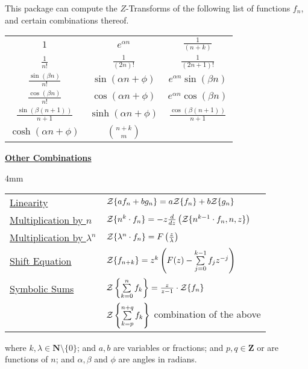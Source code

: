 This package can compute the $Z$-Transforms of the following
list of functions $f_n$, and certain combinations thereof.
\begin{center}
  \renewcommand{\arraystretch}{2}
  \setlength{\tabcolsep}{5mm}
  \begin{tabular}{ccc}
    $1$ & $e^{\alpha n}$ & $\frac{1}{(n+k)}$ \\
    $\frac{1}{n!}$ & $\frac{1}{(2n)!}$ & $\frac{1}{(2n+1)!}$ \\
    $\frac{\sin(\beta n)}{n!}$ & $\sin(\alpha n+\phi)$ & $e^{\alpha n} \sin(\beta n)$ \\
    $\frac{\cos(\beta n)}{n!}$ & $\cos(\alpha n+\phi)$ & $e^{\alpha n} \cos(\beta n)$ \\
    $\frac{\sin(\beta (n+1))}{n+1}$ & $\sinh(\alpha n+\phi)$ & $\frac{\cos(\beta (n+1))}{n+1}$ \\
    $\cosh(\alpha n+\phi)$ & $\binom{n+k}{m}$
  \end{tabular}
\end{center}

\underline{\textbf{Other Combinations}}

  \begin{setlength}{\extrarowheight}{4mm}
\begin{tabular}{ll}
\underline{Linearity} &
  ${\cal Z} \{a f_n+b g_n \} = a{\cal Z} \{f_n\}+b{\cal Z}\{g_n\}$ \\
\underline{Multiplication by $n$} & 
  ${\cal Z} \{n^k \cdot f_n\} = -z \frac{d}{dz} \left({\cal Z}\{n^{k-1} \cdot f_n,n,z\} \right)$ \\
\underline {Multiplication by $\lambda^n$} &
  ${\cal Z} \{\lambda^n \cdot f_n\}=F \left(\frac{z}{\lambda}\right)$ \\
\underline {Shift Equation} &
  ${\cal Z} \{f_{n+k}\} =
           z^k \left(F(z) - \sum\limits^{k-1}_{j=0} f_j z^{-j}\right)$ \\
\underline {Symbolic Sums} & 
  ${\cal Z} \left\{ \sum\limits_{k=0}^{n} f_k \right\} =
  \frac{z}{z-1} \cdot {\cal Z} \{f_n\}$ \\[1.5\baselineskip]
   & ${\cal Z} \left\{ \sum\limits_{k=p}^{n+q} f_k \right\}$
  \quad combination of the above
\end{tabular}
\end{setlength}

where $k,\lambda \in \mathbf{N} \setminus \{0\}$; and $a,b$ are variables or
fractions; and $p,q \in \mathbf{Z}$ or are functions of $n$; and
$\alpha,\beta$ and $\phi$ are angles in radians.

